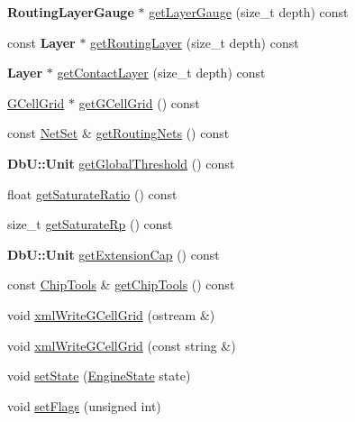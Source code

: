 \begin{DoxyCompactItemize}
\textbf{ Routing\+Layer\+Gauge} $\ast$ \hyperlink{classKatabatic_1_1KatabaticEngine_a0b7c308ac7fccc21dd0401c6ce70a586}{get\+Layer\+Gauge} (size\+\_\+t depth) const
\item 
const \textbf{ Layer} $\ast$ \hyperlink{classKatabatic_1_1KatabaticEngine_afa7ea850397e87889733ac959833b49f}{get\+Routing\+Layer} (size\+\_\+t depth) const
\item 
\textbf{ Layer} $\ast$ \hyperlink{classKatabatic_1_1KatabaticEngine_a4c4549515aef37e81f2cc6537b931edc}{get\+Contact\+Layer} (size\+\_\+t depth) const
\item 
\hyperlink{classKatabatic_1_1GCellGrid}{G\+Cell\+Grid} $\ast$ \hyperlink{classKatabatic_1_1KatabaticEngine_a9a56286f633fddd702d66563de457a4a}{get\+G\+Cell\+Grid} () const
\item 
const \hyperlink{classKatabatic_1_1KatabaticEngine_a92ed88f9aecd2f195089c4029fa8bcc7}{Net\+Set} \& \hyperlink{classKatabatic_1_1KatabaticEngine_a8f661928f8f709552c8486d68ac33c55}{get\+Routing\+Nets} () const
\item 
\textbf{ Db\+U\+::\+Unit} \hyperlink{classKatabatic_1_1KatabaticEngine_a094b479155d3f30ec54e252c35dcffa3}{get\+Global\+Threshold} () const
\item 
float \hyperlink{classKatabatic_1_1KatabaticEngine_a44d2c1fbd97dd09b102b461e906367a0}{get\+Saturate\+Ratio} () const
\item 
size\+\_\+t \hyperlink{classKatabatic_1_1KatabaticEngine_a61977cc1fd981e7f1c6125189ed20509}{get\+Saturate\+Rp} () const
\item 
\textbf{ Db\+U\+::\+Unit} \hyperlink{classKatabatic_1_1KatabaticEngine_ad9072cfa6215c92c9a9842270cf677c5}{get\+Extension\+Cap} () const
\item 
const \hyperlink{classKatabatic_1_1ChipTools}{Chip\+Tools} \& \hyperlink{classKatabatic_1_1KatabaticEngine_a423f5f2214c8b9fe73da9a86b6f6d9b9}{get\+Chip\+Tools} () const
\item 
void \hyperlink{classKatabatic_1_1KatabaticEngine_aecbe8bdcc61024a7539de3ea932c5e06}{xml\+Write\+G\+Cell\+Grid} (ostream \&)
\item 
void \hyperlink{classKatabatic_1_1KatabaticEngine_a78394ac380a0fa462f268dcc2becc50e}{xml\+Write\+G\+Cell\+Grid} (const string \&)
\item 
void \hyperlink{classKatabatic_1_1KatabaticEngine_a2391b9bfcb773398b9661b5ac0ef1a30}{set\+State} (\hyperlink{namespaceKatabatic_ab9e409db5feff0bdbc85e90e2a029cda}{Engine\+State} state)
\item 
void \hyperlink{classKatabatic_1_1KatabaticEngine_aeb14f94914af58657a0dc2f50ec98df5}{set\+Flags} (unsigned int)

\end{DoxyCompactItemize}
